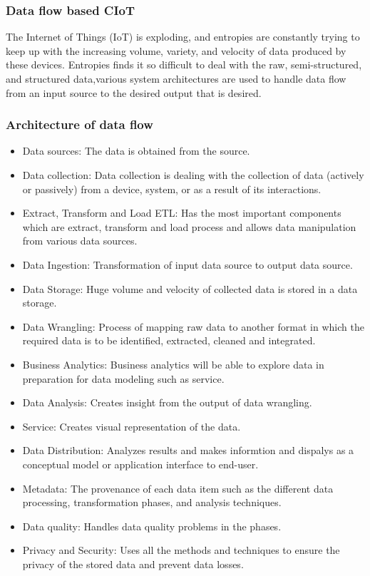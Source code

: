 \documentclass{article}
\begin{document}
\subsubsection{Data flow based CIoT}
The Internet of Things (IoT) is exploding, and entropies are constantly trying to keep up with the increasing volume, variety, and velocity of data produced by these devices. Entropies finds it so difficult to deal with the raw, semi-structured, and structured data,various system architectures are used to handle data flow from an input source to the desired output that is desired.
\subsubsection{Architecture of data flow}
\begin{itemize}
    \item{Data sources: The data is obtained from the source.}
    \item{Data collection: Data collection is dealing with the collection of data (actively or passively) from a device, system, or as a result of its interactions.}
    \item{Extract, Transform and Load ETL: Has the most important components which are extract, transform and load process and allows data manipulation from various data sources.}
    \item{Data Ingestion: Transformation of input data source to output data source.}
    \item{Data Storage: Huge volume and velocity of collected data is stored in a data storage.}
    \item{Data Wrangling: Process of mapping raw data to another format in which the required data is to be identified, extracted, cleaned and integrated.}
    \item{Business Analytics: Business analytics will be able to explore data in preparation for data modeling such as service.}
    \item{Data Analysis: Creates insight from the output of data wrangling.}
    \item{Service: Creates visual representation of the data.}
    \item{Data Distribution: Analyzes results and makes informtion and dispalys as a conceptual model or application interface to end-user.}
    \item{Metadata: The provenance of each data item such as the different data processing, transformation
    phases, and analysis techniques.}
    \item{Data quality: Handles data quality problems in the phases.}
    \item{Privacy and Security: Uses all the methods and techniques to ensure the privacy of the stored data and prevent data losses. }
\end{itemize}
\end{document}
